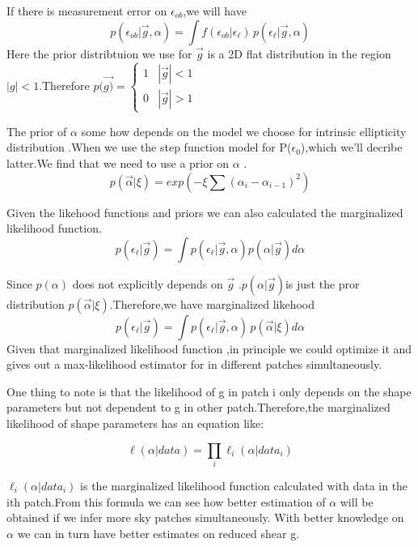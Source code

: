 \documentclass[useAMS,usenatbib]{mn2e}
\begin{document}
If there is measurement error on $\epsilon_{ob}$,we will have 
\begin{equation}
p(\epsilon_{ob}|\vec{g},\alpha)=\int f(\epsilon_{ob}|\epsilon_{\ell})\,p(\epsilon_{\ell}|\vec{g},\alpha)
\end{equation}
Here the prior distribtuion we use for $\vec{g}$ is a 2D flat distribution
in the region $|g|<1$.Therefore $p(\vec{g)}=\begin{cases}
1 & |\vec{g}|<1\\
0 & |\vec{g}|>1
\end{cases}$

The prior of $\alpha$ some how depends on the model we choose for
intrinsic ellipticity distribution .When we use the step function
model for P($\epsilon_{0}$),which we'll decribe latter.We find that
we need to use a prior on $\alpha$ .
\begin{equation}
p(\vec{\alpha}|\xi)=exp(-\xi\sum(\alpha_{i}-\alpha_{i-1})^{2})
\end{equation}


Given the likehood functions and priors we can also calculated the
marginalized likelihood function.
\begin{equation}
p(\epsilon_{\ell}|\vec{g})=\int p(\epsilon_{\ell}|\vec{g},\alpha)p(\alpha|\vec{g})d\alpha
\end{equation}


Since $p(\alpha)$ does not explicitly depends on $\vec{g}$ .$p(\alpha|\vec{g})$is
just the pror distribution $p(\vec{\alpha}|\xi)$.Therefore,we have marginalized likehood
\begin{equation}
p(\epsilon_{\ell}|\vec{g})=\int p(\epsilon_{\ell}|\vec{g},\alpha)\,p(\vec{\alpha}|\xi)d\alpha
\end{equation}
Given that marginalized likelihood function ,in principle we could optimize it  and gives out a max-likelihood estimator 
for  in different patches simultaneously.


One thing to note is that the likelihood of g in patch i only depends
on the shape parameters but not dependent to g in other patch.Therefore,the
marginalized likelihood of shape parameters has an equation like:

\begin{equation}
\ell(\alpha|data)=\prod_{i}\ell_{i}(\alpha|data_{i})
\end{equation}


$\ell_{i}(\alpha|data_{i})$ is the marginalized likelihood function
calculated with data in the ith patch.From this formula we can see
how better estimation of $\alpha$ will be obtained if we infer more
sky patches simultaneously. With better knowledge on $\alpha$ we can
in turn have better estimates on reduced shear g.
\end{document}
